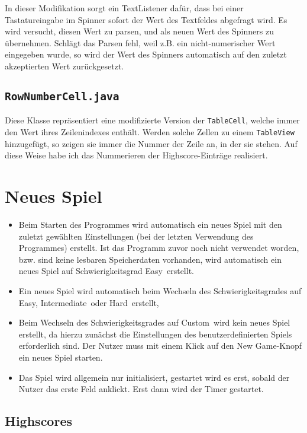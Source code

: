\documentclass[oneside,12pt]{scrartcl}
\newcommand*{\EnableHyphenationInTexttt}{\hyphenchar\font=45\relax}%
\newcommand{\class}[1]{\textcolor{Green4}{\bcode{#1}}}
\newcommand{\bcode}[1]{\texttt{\EnableHyphenationInTexttt#1}}
\begin{document}
In dieser Modifikation sorgt ein TextListener dafür, dass bei einer Tastatureingabe im Spinner sofort der Wert des Textfeldes abgefragt wird. Es wird versucht, diesen Wert zu parsen, und als neuen Wert des Spinners zu übernehmen. Schlägt das Parsen fehl, weil z.B. ein nicht-numerischer Wert eingegeben wurde, so wird der Wert des Spinners automatisch auf den zuletzt akzeptierten Wert zurückgesetzt.

\subsection{\class{RowNumberCell.java}}
Diese Klasse repräsentiert eine modifizierte Version der \class{TableCell}, welche immer den Wert ihres Zeilenindexes enthält. Werden solche Zellen zu einem \class{TableView} hinzugefügt, so zeigen sie immer die Nummer der Zeile an, in der sie stehen. Auf diese Weise habe ich das Nummerieren der Highscore-Einträge realisiert.

\section{Neues Spiel}
\begin{itemize}
\item Beim Starten des Programmes wird automatisch ein neues Spiel mit den zuletzt gewählten Einstellungen (bei der letzten Verwendung des Programmes) erstellt. Ist das Programm zuvor noch nicht verwendet worden, bzw. sind keine lesbaren Speicherdaten vorhanden, wird automatisch ein neues Spiel auf Schwierigkeitsgrad \glqq Easy\grqq\ erstellt.
\item Ein neues Spiel wird automatisch beim Wechseln des Schwierigkeitsgrades auf \glqq Easy\grqq, \glqq Intermediate\grqq\ oder \glqq Hard\grqq\ erstellt,
\item Beim Wechseln des Schwierigkeitsgrades auf \glqq Custom\grqq\ wird kein neues Spiel erstellt, da hierzu zunächst die Einstellungen des benutzerdefinierten Spiels erforderlich sind. Der Nutzer muss mit einem Klick auf den \glqq New Game\grqq-Knopf ein neues Spiel starten.
\item Das Spiel wird allgemein nur initialisiert, gestartet wird es erst, sobald der Nutzer das erste Feld anklickt. Erst dann wird der Timer gestartet.
\end{itemize}

\subsection{Highscores}
\end{document}
